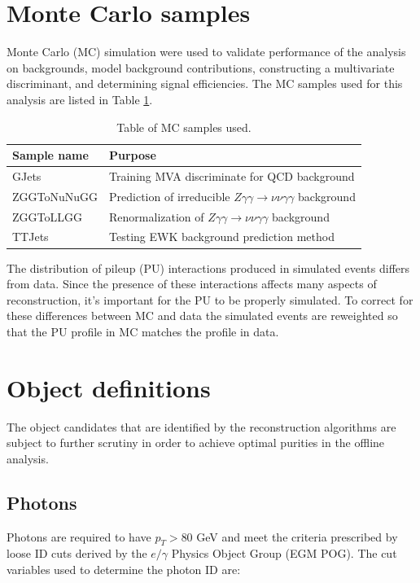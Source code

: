 \section{Monte Carlo samples}
Monte Carlo (MC) simulation were used to validate performance of the analysis on backgrounds, model background contributions, constructing a multivariate discriminant, and determining signal efficiencies.   The MC samples used for this analysis are listed in Table \ref{table:MCSamples}.
\begin{table}
	\centering
	\caption{Table of MC samples used.}
	\begin{tabular}{|l|l|}
		\hline
		Sample name & Purpose \\
		\hline
		\hline
		GJets & Training MVA discriminate for QCD background \\
		\hline
		ZGGToNuNuGG & Prediction of irreducible $Z\gamma \gamma \rightarrow \nu \nu \gamma \gamma$ background \\
		\hline
		ZGGToLLGG & Renormalization of $Z\gamma \gamma \rightarrow \nu \nu \gamma \gamma$ background \\
		\hline
		TTJets & Testing EWK background prediction method\\
		\hline
	\end{tabular}
	\label{table:MCSamples}
\end{table}

The distribution of pileup (PU) interactions produced in simulated events differs from data.  Since the presence of these interactions affects many aspects of reconstruction, it's important for the PU to be properly simulated.  To correct for these differences between MC and data the simulated events are reweighted so that the PU profile in MC matches the profile in data.  
  


\section{Object definitions}
The object candidates that are identified by the reconstruction algorithms are subject to further scrutiny in order to achieve optimal purities in the offline analysis.  

\subsection{Photons}
Photons are required to have $p_T>80$ GeV and meet the criteria prescribed by loose ID cuts derived by the $e/\gamma$ Physics Object Group (EGM POG).  The cut variables used to determine the photon ID are:

